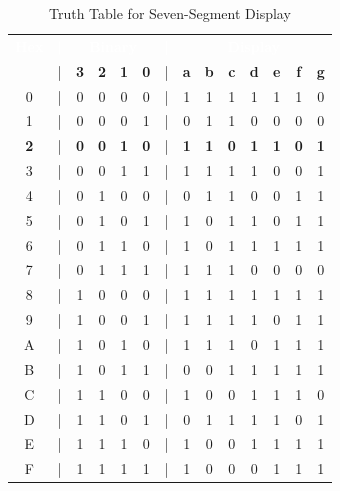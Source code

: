 \begin{table}[H]
  \sffamily
  \newcommand{\head}[1]{\textcolor{white}{\textbf{#1}}}    
  \begin{center}
    \begin{tabular}{cccccccccccccc} 
      \rowcolor{black!75}
      \head{Hex} & \head{|} & \multicolumn{4}{c}{\head{Binary}} & \head{|} & \multicolumn{7}{c}{\head{Display}} \\
        &|& \textbf{3} & \textbf{2} & \textbf{1} & \textbf{0} &|& \textbf{a} & \textbf{b} & \textbf{c} & \textbf{d} & \textbf{e} & \textbf{f} & \textbf{g} \\
      0 &|& 0 & 0 & 0 & 0 &|& 1 & 1 & 1 & 1 & 1 & 1 & 0 \\
      1 &|& 0 & 0 & 0 & 1 &|& 0 & 1 & 1 & 0 & 0 & 0 & 0 \\
      \textbf{2} &|& \textbf{0} & \textbf{0} & \textbf{1} & 
        \textbf{0} &|& \textbf{1} & \textbf{1} & \textbf{0} & 
        \textbf{1} & \textbf{1} & \textbf{0} & \textbf{1} \\
      3 &|& 0 & 0 & 1 & 1 &|& 1 & 1 & 1 & 1 & 0 & 0 & 1 \\
      4 &|& 0 & 1 & 0 & 0 &|& 0 & 1 & 1 & 0 & 0 & 1 & 1 \\
      5 &|& 0 & 1 & 0 & 1 &|& 1 & 0 & 1 & 1 & 0 & 1 & 1 \\
      6 &|& 0 & 1 & 1 & 0 &|& 1 & 0 & 1 & 1 & 1 & 1 & 1 \\
      7 &|& 0 & 1 & 1 & 1 &|& 1 & 1 & 1 & 0 & 0 & 0 & 0 \\
      8 &|& 1 & 0 & 0 & 0 &|& 1 & 1 & 1 & 1 & 1 & 1 & 1 \\
      9 &|& 1 & 0 & 0 & 1 &|& 1 & 1 & 1 & 1 & 0 & 1 & 1 \\
      A &|& 1 & 0 & 1 & 0 &|& 1 & 1 & 1 & 0 & 1 & 1 & 1 \\
      B &|& 1 & 0 & 1 & 1 &|& 0 & 0 & 1 & 1 & 1 & 1 & 1 \\
      C &|& 1 & 1 & 0 & 0 &|& 1 & 0 & 0 & 1 & 1 & 1 & 0 \\
      D &|& 1 & 1 & 0 & 1 &|& 0 & 1 & 1 & 1 & 1 & 0 & 1 \\
      E &|& 1 & 1 & 1 & 0 &|& 1 & 0 & 0 & 1 & 1 & 1 & 1 \\
      F &|& 1 & 1 & 1 & 1 &|& 1 & 0 & 0 & 0 & 1 & 1 & 1 
    \end{tabular}
  \end{center}
  \caption{Truth Table for Seven-Segment Display}
  \label{CL:tab:truth_table_for_seven_segment_display}
\end{table}

